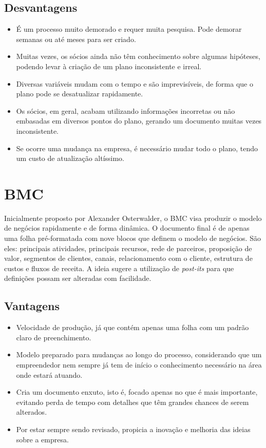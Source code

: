\subsection{Desvantagens}

\begin{itemize}
\item É um processo muito demorado e requer muita pesquisa. Pode demorar semanas ou até meses para ser criado.
\item Muitas vezes, os sócios ainda não têm conhecimento sobre algumas hipóteses, podendo levar à criação de um plano inconsistente e irreal.
\item Diversas variáveis mudam com o tempo e são imprevisíveis, de forma que o plano pode se desatualizar rapidamente.
\item Os sócios, em geral, acabam utilizando informações incorretas ou não embasadas em diversos pontos do plano, gerando um documento muitas vezes inconsistente.
\item Se ocorre uma mudança na empresa, é necessário mudar todo o plano, tendo um custo de atualização altíssimo.
\end{itemize}

\section{BMC}

Inicialmente proposto por Alexander Osterwalder, o BMC visa produzir o modelo de negócios rapidamente e de forma dinâmica. O documento final é de apenas uma folha pré-formatada com nove blocos que definem o modelo de negócios. São eles: principais atividades, principais recursos, rede de parceiros, proposição de valor, segmentos de clientes, canais, relacionamento com o cliente, estrutura de custos e fluxos de receita. A ideia sugere a utilização de \textit{post-its} para que definições possam ser alteradas com facilidade.~\cite{tutorialbmc}

\subsection{Vantagens}

\begin{itemize}
\item Velocidade de produção, já que contém apenas uma folha com um padrão claro de preenchimento.
\item Modelo preparado para mudanças ao longo do processo, considerando que um empreendedor nem sempre já tem de início o conhecimento necessário na área onde estará atuando.
\item Cria um documento enxuto, isto é, focado apenas no que é mais importante, evitando perda de tempo com detalhes que têm grandes chances de serem alterados.
\item Por estar sempre sendo revisado, propicia a inovação e melhoria das ideias sobre a empresa.
\end{itemize}

